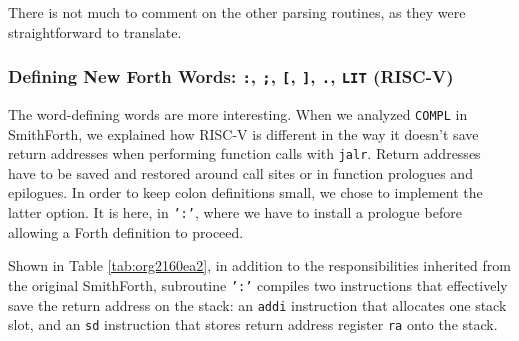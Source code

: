 \documentclass[a4paper,12pt,final]{article}
\begin{document}
There is not much to comment on the other parsing routines, as they
were straightforward to translate.

\subsubsection{Defining New Forth Words: \texttt{:}, \texttt{;}, \texttt{[}, \texttt{]}, \texttt{.}, \texttt{LIT} (RISC-V)}
\label{sec:org43f4163}

The word-defining words are more interesting.  When we analyzed
\texttt{COMPL} in SmithForth, we explained how RISC-V is different in the way
it doesn't save return addresses when performing function calls with
\texttt{jalr}.  Return addresses have to be saved and restored around call
sites or in function prologues and epilogues.  In order to keep colon
definitions small, we chose to implement the latter option.  It is
here, in \texttt{':'}, where we have to install a prologue before allowing a
Forth definition to proceed.

Shown in Table \ref{tab:org2160ea2}, in addition to the responsibilities
inherited from the original SmithForth, subroutine \texttt{':'} compiles two
instructions that effectively save the return address on the stack: an
\texttt{addi} instruction that allocates one stack slot, and an \texttt{sd}
instruction that stores return address register \texttt{ra} onto the stack.
\end{document}
